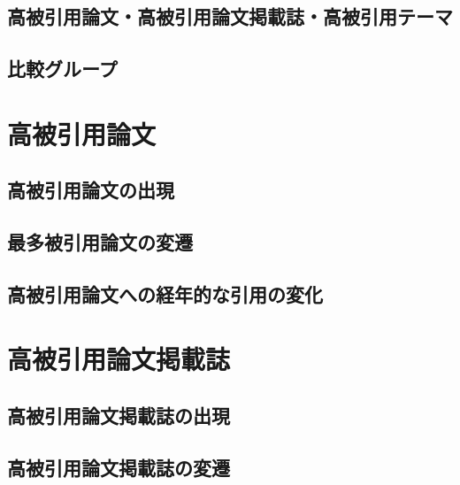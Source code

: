 \documentclass[12pt,a4paper,twocolumn,twoside]{ujsikpb}
\begin{document}
\subsection{高被引用論文・高被引用論文掲載誌・高被引用テーマ}



\subsection{比較グループ}


\section{高被引用論文}
\subsection{高被引用論文の出現}



\subsection{最多被引用論文の変遷}



\subsection{高被引用論文への経年的な引用の変化}










\section{高被引用論文掲載誌}

\subsection{高被引用論文掲載誌の出現}



\subsection{高被引用論文掲載誌の変遷}






\end{document}
